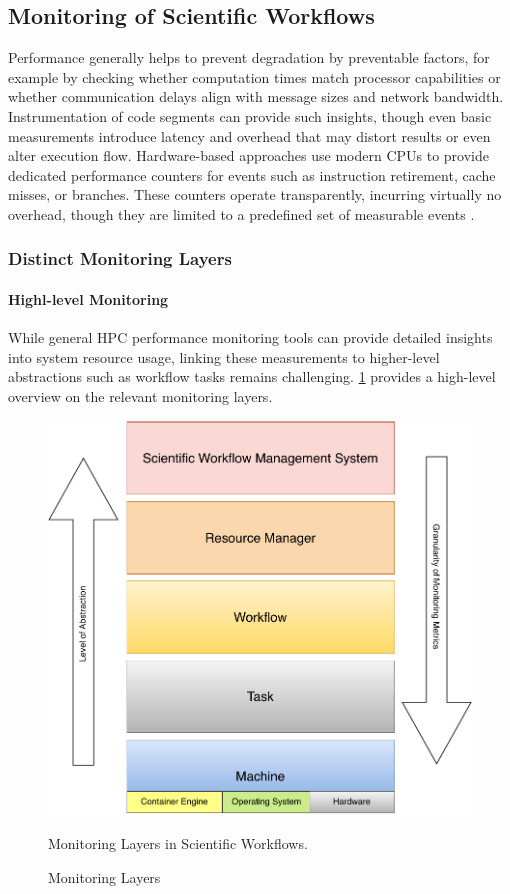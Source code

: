 \subsection{Monitoring of Scientific Workflows}
\label{sec:background_monitoring}
Performance generally helps to prevent degradation by preventable factors, for example by checking whether computation times match processor capabilities or whether communication delays align with message sizes and network bandwidth. Instrumentation of code segments can provide such insights, though even basic measurements introduce latency and overhead that may distort results or even alter execution flow. Hardware-based approaches use modern CPUs to provide dedicated performance counters for events such as instruction retirement, cache misses, or branches. These counters operate transparently, incurring virtually no overhead, though they are limited to a predefined set of measurable events \cite{STERLING201843}.

\subsubsection{Distinct Monitoring Layers}
\label{sec:background_monitoring_layers}
\paragraph{Highl-level Monitoring}
While general HPC performance monitoring tools can provide detailed insights into system resource usage, linking these measurements to higher-level abstractions such as workflow tasks remains challenging. \ref{fig:02-monitoring-layers} provides a high-level overview on the relevant monitoring layers.

\begin{figure}[H]
    \centering
    \includegraphics[scale=0.5]{fig/02/02-monitoring-layers.pdf}
    \caption{Monitoring Layers}
    \label{fig:02-monitoring-layers}
    \tiny
    Monitoring Layers in Scientific Workflows.
\end{figure}

